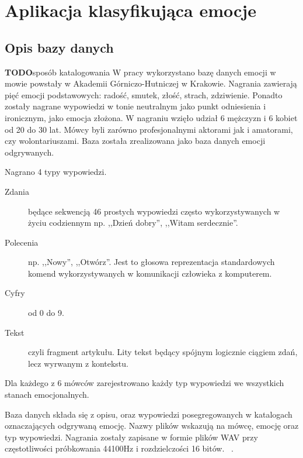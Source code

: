 \documentclass[a4paper,12pt,twoside,openany]{report}
\newcommand{\TODO}{\textbf{TODO}}
\begin{document}
\chapter{Aplikacja klasyfikująca emocje}
\section{Opis bazy danych}\label{sec:opis_bazy_danych}
\TODO{sposób katalogowania}
W pracy wykorzystano bazę danych emocji w mowie powstały w Akademii Górniczo-Hutniczej w Krakowie.
Nagrania zawierają pięć emocji podstawowych: radość, smutek, złość, strach, zdziwienie.
Ponadto zostały nagrane wypowiedzi w tonie neutralnym jako punkt odniesienia i ironicznym, jako emocja złożona.
W nagraniu wzięło udział 6 mężczyzn i 6 kobiet od 20 do 30 lat. 
Mówcy byli zarówno profesjonalnymi aktorami jak i amatorami, czy wolontariuszami.
Baza została zrealizowana jako baza danych emocji odgrywanych. 

Nagrano 4 typy wypowiedzi.
\begin{description}
	\item [Zdania] będące sekwencją 46 prostych wypowiedzi często wykorzystywanych w życiu codziennym 
		np. ,,Dzień dobry'', ,,Witam serdecznie''. 
	\item [Polecenia]  np. ,,Nowy'', ,,Otwórz''. 
		Jest to głosowa reprezentacja standardowych komend wykorzystywanych w komunikacji człowieka z komputerem.
	\item [Cyfry] od 0 do 9.
	\item [Tekst] czyli fragment artykułu. 
		Lity tekst będący spójnym logicznie ciągiem zdań, lecz wyrwanym z kontekstu.
\end{description}
Dla każdego z 6 mówców zarejestrowano każdy typ wypowiedzi we wszystkich stanach emocjonalnych.

Baza danych składa się z opisu, oraz wypowiedzi posegregowanych w katalogach oznaczających odgrywaną emocję.
Nazwy plików wskazują na mówcę, emocję oraz typ wypowiedzi.
Nagrania zostały zapisane w formie plików WAV przy częstotliwości próbkowania 44100Hz i rozdzielczości 16 bitów. ~\cite{Igras2009}.
\end{document}
